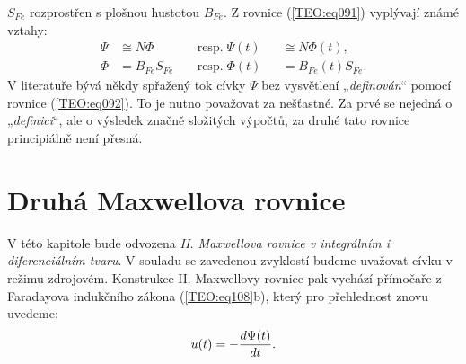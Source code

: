       \(S_{Fe}\) rozprostřen s plošnou hustotou \(B_{Fe}\). Z rovnice (\ref{TEO:eq091}) vyplývají
      známé vztahy:
      \begin{subequations}\label{TEO:eq092} 
        \begin{alignat}{3}
          \Psi & \cong  N\Phi   && \;\text{resp.}\; \Psi(t)&& \cong  N\Phi(t),  \label{TEO:eq092a}\\ 
          \Phi & =  B_{Fe}S_{Fe}&& \;\text{resp.}\; \Phi(t)&& = B_{Fe}(t)S_{Fe}.\label{TEO:eq092b}  
        \end{alignat}
      \end{subequations}
      V literatuře bývá někdy spřažený tok cívky \(\Psi\) bez vysvětlení „\emph{definován}“ pomocí
      rovnice (\ref{TEO:eq092}). To je nutno považovat za nešťastné. Za prvé se nejedná o
      „\emph{definici}“, ale o výsledek značně složitých výpočtů, za druhé tato rovnice principiálně
      není přesná.

    \section{Druhá Maxwellova rovnice}\label{ES:sec04}    
      V této kapitole bude odvozena \emph{II. Maxwellova rovnice v integrálním i diferenciálním 
      tvaru}. V souladu se zavedenou zvyklostí budeme uvažovat cívku v režimu zdrojovém. Konstrukce 
      II. Maxwellovy rovnice pak vychází přímočaře z Faradayova indukčního zákona 
      (\ref{TEO:eq108}b), který pro přehlednost znovu uvedeme:
      \begin{equation}\label{TEO:eq111}
      u(t) = -\dfrac{d \Psi(t)}{d t}.
      \end{equation}
      

